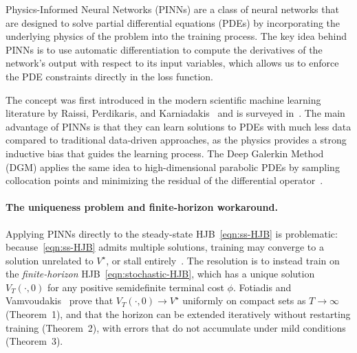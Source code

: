 Physics-Informed Neural Networks (PINNs) are a class of neural networks that are designed to solve partial differential equations (PDEs) by incorporating the underlying physics of the problem into the training process. The key idea behind PINNs is to use automatic differentiation to compute the derivatives of the network's output with respect to its input variables, which allows us to enforce the PDE constraints directly in the loss function.

The concept was first introduced in the modern scientific machine learning literature by Raissi, Perdikaris, and Karniadakis~\cite{raissi2019physics} and is surveyed in~\cite{karniadakis2021physics}. The main advantage of PINNs is that they can learn solutions to PDEs with much less data compared to traditional data-driven approaches, as the physics provides a strong inductive bias that guides the learning process. The Deep Galerkin Method (DGM) applies the same idea to high-dimensional parabolic PDEs by sampling collocation points and minimizing the residual of the differential operator~\cite{sirignano2018dgm}.

\paragraph{The uniqueness problem and finite-horizon workaround.}
Applying PINNs directly to the steady-state HJB~\eqref{eqn:ss-HJB}
is problematic: because~\eqref{eqn:ss-HJB} admits multiple solutions,
training may converge to a solution unrelated to $V^\star$, or stall
entirely~\cite{fotiadis2025pinn}.
The resolution is to instead train on the \emph{finite-horizon} HJB~\eqref{eqn:stochastic-HJB},
which has a unique solution $V_T(\cdot,0)$ for any positive semidefinite
terminal cost $\phi$.
Fotiadis and Vamvoudakis~\cite{fotiadis2025pinn} prove that
$V_T(\cdot,0)\to V^\star$ uniformly on compact sets as $T\to\infty$
(Theorem~1), and that the horizon can be extended iteratively without
restarting training (Theorem~2), with errors that do not accumulate
under mild conditions (Theorem~3).

